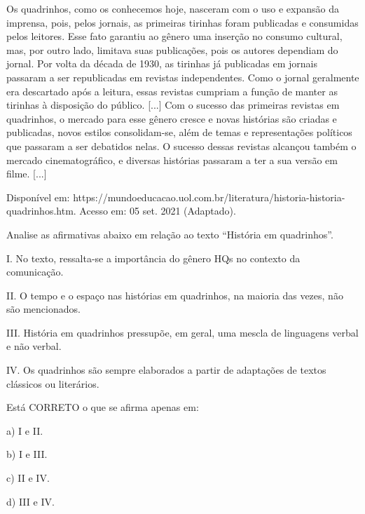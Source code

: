 \par

Os quadrinhos, como os conhecemos hoje, nasceram com o uso e expansão da imprensa, pois, pelos jornais, as primeiras tirinhas foram publicadas e consumidas pelos leitores. Esse fato garantiu ao gênero uma inserção no consumo cultural, mas, por outro lado, limitava suas publicações, pois os autores dependiam do jornal. Por volta da década de 1930, as tirinhas já publicadas em jornais passaram a ser republicadas em revistas independentes. Como o jornal geralmente era descartado após a leitura, essas revistas cumpriam a função de manter as tirinhas à disposição do público. [...] Com o sucesso das primeiras revistas em quadrinhos, o mercado para esse gênero cresce e novas histórias são criadas e publicadas, novos estilos consolidam-se, além de temas e representações políticos que passaram a ser debatidos nelas. O sucesso dessas revistas alcançou também o mercado cinematográfico, e diversas histórias passaram a ter a sua versão em filme. [...]

\par

Disponível em: https://mundoeducacao.uol.com.br/literatura/historia-historia-quadrinhos.htm. Acesso em: 05 set. 2021 (Adaptado).

\par

Analise as afirmativas abaixo em relação ao texto “História em quadrinhos”.

\par

I. No texto, ressalta-se a importância do gênero HQs no contexto da comunicação.\par
II. O tempo e o espaço nas histórias em quadrinhos, na maioria das vezes, não são mencionados.\par
III. História em quadrinhos pressupõe, em geral, uma mescla de linguagens verbal e não verbal.\par
IV. Os quadrinhos são sempre elaborados a partir de adaptações de textos clássicos ou literários.

\par

Está CORRETO o que se afirma apenas em:

\par

a) I e II.\par
b) I e III.\par
c) II e IV.\par
d) III e IV.
